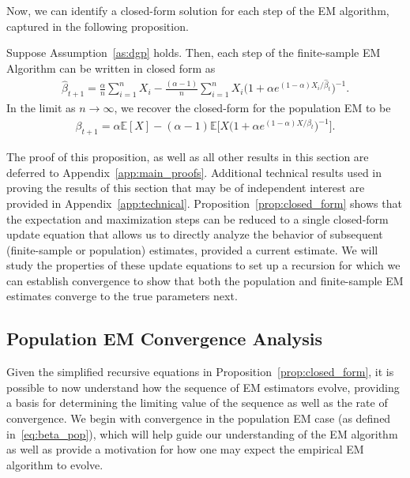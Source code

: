 \documentclass[runningheads]{llncs}
\begin{document}
Now, we can identify a
closed-form solution for each step of the EM algorithm, captured in the
following proposition.
\begin{proposition}
  \label{prop:closed_form}
  Suppose Assumption~\ref{as:dgp} holds. Then, each step of the finite-sample EM
  Algorithm can be written in closed form as
\begin{align}
  \label{eq:beta_hat}
    \hat{\beta}_{t+1}
    = \frac{\alpha}{n} \sum_{i=1}^n X_i
  - \frac{(\alpha - 1)}{n}
  \sum_{i=1}^n X_i \big(1+\alpha e^{(1-\alpha)X_i / \hat{\beta}_t}\big)^{-1}.
\end{align}
In the limit as $n \rightarrow \infty$, we recover the closed-form for the
population EM to be
\begin{align}
  \label{eq:beta_pop}
  \beta_{t+1}
  = \alpha \mathbb{E}[X]
  - (\alpha - 1)\mathbb{E}\bigg[X \big(1+\alpha e^{(1-\alpha)X / \beta_t}\big)^{-1}\bigg].
\end{align}
\end{proposition}
The proof of this proposition, as well as all other results in this
section are deferred to Appendix~\ref{app:main_proofs}. Additional technical
results used in proving the results of this section that may be of independent
interest are provided in Appendix~\ref{app:technical}.
Proposition~\ref{prop:closed_form} shows that the expectation and maximization
steps can be reduced to a single closed-form update equation that allows us to
directly analyze the behavior of subsequent (finite-sample or population)
estimates, provided a current estimate. We will study the properties of
these update equations to set up a recursion for which we can establish
convergence to show that both the population and finite-sample EM estimates
converge to the true parameters next.

\subsection{Population EM Convergence Analysis}
\label{sec:pop-results}
Given the simplified recursive equations in Proposition~\ref{prop:closed_form},
it is possible to now understand how the sequence of EM estimators evolve,
providing a basis for determining the limiting value of the sequence as well as
the rate of convergence. We begin with convergence in the population EM
case (as defined in~\eqref{eq:beta_pop}), which will help guide our
understanding of the EM algorithm as well as provide a motivation
for how one may expect the empirical EM algorithm to evolve.
\end{document}
